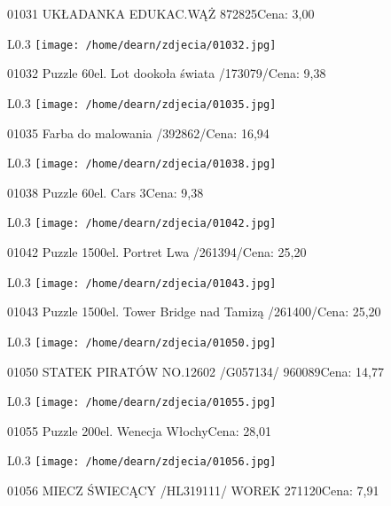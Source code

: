 01031 UKŁADANKA EDUKAC.WĄŻ 872825Cena: 3,00\newline
\begin{wrapfigure}{L}{0.3\textwidth}
\texttt{[image: /home/dearn/zdjecia/01032.jpg]}
\end{wrapfigure}
01032 Puzzle 60el. Lot dookoła świata  /173079/Cena: 9,38\newline
\begin{wrapfigure}{L}{0.3\textwidth}
\texttt{[image: /home/dearn/zdjecia/01035.jpg]}
\end{wrapfigure}
01035 Farba do malowania /392862/Cena: 16,94\newline
\begin{wrapfigure}{L}{0.3\textwidth}
\texttt{[image: /home/dearn/zdjecia/01038.jpg]}
\end{wrapfigure}
01038 Puzzle 60el. Cars 3Cena: 9,38\newline
\begin{wrapfigure}{L}{0.3\textwidth}
\texttt{[image: /home/dearn/zdjecia/01042.jpg]}
\end{wrapfigure}
01042 Puzzle 1500el. Portret Lwa  /261394/Cena: 25,20\newline
\begin{wrapfigure}{L}{0.3\textwidth}
\texttt{[image: /home/dearn/zdjecia/01043.jpg]}
\end{wrapfigure}
01043 Puzzle 1500el. Tower Bridge nad Tamizą  /261400/Cena: 25,20\newline
\begin{wrapfigure}{L}{0.3\textwidth}
\texttt{[image: /home/dearn/zdjecia/01050.jpg]}
\end{wrapfigure}
01050 STATEK PIRATÓW NO.12602 /G057134/               960089Cena: 14,77\newline
\begin{wrapfigure}{L}{0.3\textwidth}
\texttt{[image: /home/dearn/zdjecia/01055.jpg]}
\end{wrapfigure}
01055 Puzzle 200el. Wenecja WłochyCena: 28,01\newline
\begin{wrapfigure}{L}{0.3\textwidth}
\texttt{[image: /home/dearn/zdjecia/01056.jpg]}
\end{wrapfigure}
01056 MIECZ ŚWIECĄCY  /HL319111/  WOREK               271120Cena: 7,91\newline
